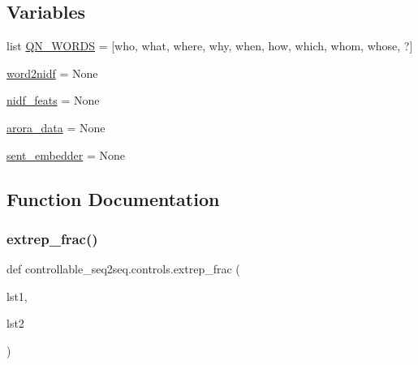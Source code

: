 \subsection*{Variables}
\begin{DoxyCompactItemize}
\item 
list \hyperlink{namespacecontrollable__seq2seq_1_1controls_a5535e0663f09c5061245904e0aaf436a}{Q\+N\+\_\+\+W\+O\+R\+DS} = \mbox{[}\textquotesingle{}who\textquotesingle{}, \textquotesingle{}what\textquotesingle{}, \textquotesingle{}where\textquotesingle{}, \textquotesingle{}why\textquotesingle{}, \textquotesingle{}when\textquotesingle{}, \textquotesingle{}how\textquotesingle{}, \textquotesingle{}which\textquotesingle{}, \textquotesingle{}whom\textquotesingle{}, \textquotesingle{}whose\textquotesingle{}, \textquotesingle{}?\textquotesingle{}\mbox{]}
\item 
\hyperlink{namespacecontrollable__seq2seq_1_1controls_af2d340f78bb7909b7b83d5885c73cc74}{word2nidf} = None
\item 
\hyperlink{namespacecontrollable__seq2seq_1_1controls_a83011dc734f822639cf3380a3a3849ff}{nidf\+\_\+feats} = None
\item 
\hyperlink{namespacecontrollable__seq2seq_1_1controls_a0695071a22dc75dfdc169d714b4ecf87}{arora\+\_\+data} = None
\item 
\hyperlink{namespacecontrollable__seq2seq_1_1controls_affa5fc3ee0e93bf66f941cfdf112d887}{sent\+\_\+embedder} = None
\end{DoxyCompactItemize}


\subsection{Function Documentation}
\mbox{\label{namespacecontrollable__seq2seq_1_1controls_ab7554c2785504a4bd181168ad30ba9e0}} 
\subsubsection{\texorpdfstring{extrep\+\_\+frac()}{extrep\_frac()}}
{\footnotesize\ttfamily def controllable\+\_\+seq2seq.\+controls.\+extrep\+\_\+frac (\begin{DoxyParamCaption}\item[{}]{lst1,  }\item[{}]{lst2 }\end{DoxyParamCaption})}

